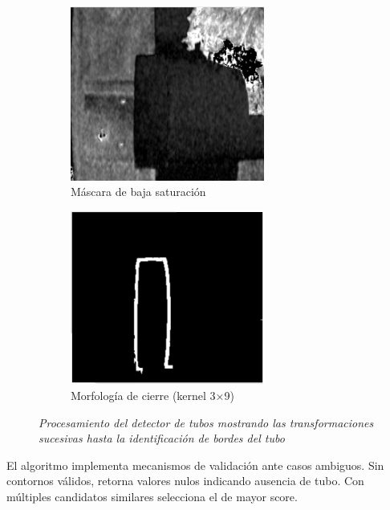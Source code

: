 \begin{figure}[H]
\begin{subfigure}[b]{0.48\textwidth}
    \centering
    \includegraphics[width=0.7\textwidth]{imagenes/detector_tubos_3_canal_s.png}
    \caption{Máscara de baja saturación}
\end{subfigure}
\hfill
\begin{subfigure}[b]{0.48\textwidth}
    \centering
    \includegraphics[width=0.7\textwidth]{imagenes/detector_tubos_5_morfologia.png}
    \caption{Morfología de cierre (kernel 3×9)}
\end{subfigure}

\vspace{0.3cm}

\caption{\textit{Procesamiento del detector de tubos mostrando las transformaciones sucesivas hasta la identificación de bordes del tubo}}
\label{fig:proceso_tubos}
\end{figure}

El algoritmo implementa mecanismos de validación ante casos ambiguos. Sin contornos válidos, retorna valores nulos indicando ausencia de tubo. Con múltiples candidatos similares selecciona el de mayor score. 

